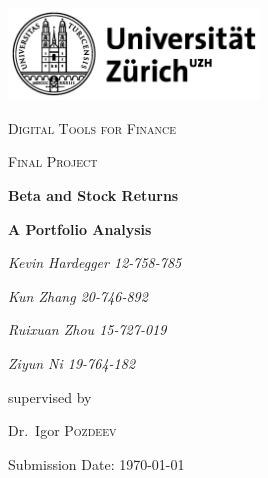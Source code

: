 \documentclass[12pt,a4paper]{article}
\begin{document}
\begin{titlepage}
	\centering
	\includegraphics[width=0.5\textwidth]{UZH LOGO.png}\par\vspace{1cm}
	{\scshape\LARGE Digital Tools for Finance \par}
	\vspace{1cm}
	{\scshape\Large Final Project\par}
	\vspace{1.5cm}
	{\huge\bfseries Beta and Stock Returns\par}
	{\large\bfseries A Portfolio Analysis\par}
	\vspace{2cm}
	\leftline
	{\Large\itshape Kevin Hardegger     12-758-785\par}
	\vspace{1cm}
	\leftline
	{\Large\itshape Kun Zhang   20-746-892\par}
	\vspace{1cm}
	\leftline
	{\Large\itshape Ruixuan Zhou    15-727-019\par}
	\vspace{1cm}
	\leftline
	{\Large\itshape Ziyun Ni    19-764-182\par}
	\vspace{1cm}
	\vfill\large
	supervised by\par
	Dr.~Igor \textsc{Pozdeev}
	\vfill

    \vspace{1cm}
	{\large Submission Date: \today\par}
\end{titlepage}

\renewcommand*\contentsname{Table of Contents}
\tableofcontents
{}
\vspace{1cm}
\listoffigures
\vspace{1cm}
\listoftables

\newpage
\setcounter{page}{1}
\end{document}
